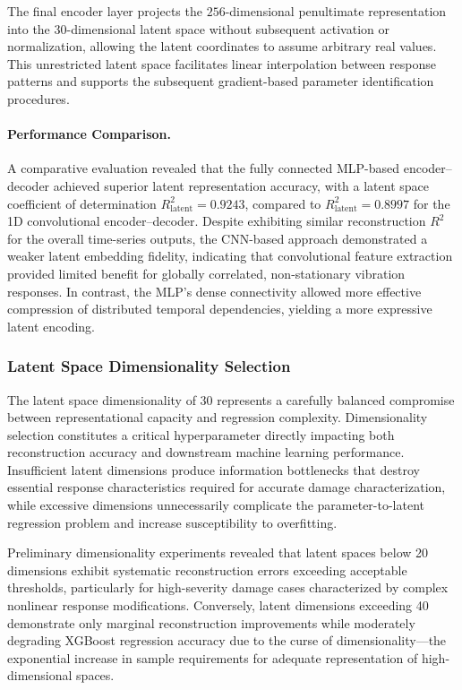 \documentclass[12pt,a4paper]{report}
\begin{document}
The final encoder layer projects the $256$-dimensional penultimate representation into the $30$-dimensional latent space without subsequent activation or normalization, allowing the latent coordinates to assume arbitrary real values. This unrestricted latent space facilitates linear interpolation between response patterns and supports the subsequent gradient-based parameter identification procedures.

\paragraph{Performance Comparison.}
A comparative evaluation revealed that the fully connected MLP-based encoder–decoder achieved superior latent representation accuracy, with a latent space coefficient of determination $R^2_{\text{latent}} = 0.9243$, compared to $R^2_{\text{latent}} = 0.8997$ for the 1D convolutional encoder–decoder. Despite exhibiting similar reconstruction $R^2$ for the overall time-series outputs, the CNN-based approach demonstrated a weaker latent embedding fidelity, indicating that convolutional feature extraction provided limited benefit for globally correlated, non-stationary vibration responses. In contrast, the MLP’s dense connectivity allowed more effective compression of distributed temporal dependencies, yielding a more expressive latent encoding.


\subsubsection{Latent Space Dimensionality Selection}


The latent space dimensionality of 30 represents a carefully balanced compromise between representational capacity and regression complexity. Dimensionality selection constitutes a critical hyperparameter directly impacting both reconstruction accuracy and downstream machine learning performance. Insufficient latent dimensions produce information bottlenecks that destroy essential response characteristics required for accurate damage characterization, while excessive dimensions unnecessarily complicate the parameter-to-latent regression problem and increase susceptibility to overfitting.


Preliminary dimensionality experiments revealed that latent spaces below 20 dimensions exhibit systematic reconstruction errors exceeding acceptable thresholds, particularly for high-severity damage cases characterized by complex nonlinear response modifications. Conversely, latent dimensions exceeding 40 demonstrate only marginal reconstruction improvements while moderately degrading XGBoost regression accuracy due to the curse of dimensionality—the exponential increase in sample requirements for adequate representation of high-dimensional spaces.
\end{document}
